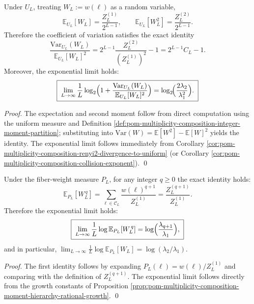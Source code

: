\begin{corollary}\label{cor:pom-multiplicity-composition-uniform-variance-explosion}
Under \(U_L\), treating \(W_L:=w(\boldsymbol{\ell})\) as a random variable,
\[
\mathbb{E}_{U_L}[W_L]=\frac{Z_L^{(1)}}{2^{L-1}},
\qquad
\mathbb{E}_{U_L}[W_L^2]=\frac{Z_L^{(2)}}{2^{L-1}}.
\]
Therefore the coefficient of variation satisfies the exact identity
\[
\boxed{\;
\frac{\mathrm{Var}_{U_L}(W_L)}{\mathbb{E}_{U_L}[W_L]^2}
=2^{L-1}\frac{Z_L^{(2)}}{(Z_L^{(1)})^2}-1
=2^{L-1}C_L-1.\;}
\]
Moreover, the exponential limit holds:
\[
\boxed{\;
\lim_{L\to\infty}\frac{1}{L}\log_2\Bigl(1+\frac{\mathrm{Var}_{U_L}(W_L)}{\mathbb{E}_{U_L}[W_L]^2}\Bigr)
=\log_2\!\Bigl(\frac{2\lambda_2}{\lambda_1^2}\Bigr).\;}
\]
\end{corollary}
\begin{proof}
The expectation and second moment follow from direct computation using the uniform measure and Definition \ref{def:pom-multiplicity-composition-integer-moment-partition};
substituting into \(\mathrm{Var}(W)=\mathbb{E}[W^2]-\mathbb{E}[W]^2\) yields the identity.
The exponential limit follows immediately from Corollary \ref{cor:pom-multiplicity-composition-renyi2-divergence-to-uniform} (or Corollary \ref{cor:pom-multiplicity-composition-collision-exponent}). \qed
\end{proof}

\begin{proposition}\label{prop:pom-multiplicity-composition-moment-shift-law}
Under the fiber-weight measure \(P_L\), for any integer \(q\ge 0\) the exact identity holds:
\[
\boxed{\;
\mathbb{E}_{P_L}[W_L^{\,q}]
=\sum_{\boldsymbol{\ell}\in\mathcal{C}_L}\frac{w(\boldsymbol{\ell})^{q+1}}{Z_L^{(1)}}
=\frac{Z_L^{(q+1)}}{Z_L^{(1)}}.\;}
\]
Therefore the exponential limit holds:
\[
\boxed{\;
\lim_{L\to\infty}\frac{1}{L}\log \mathbb{E}_{P_L}[W_L^{\,q}]
=\log\Bigl(\frac{\lambda_{q+1}}{\lambda_1}\Bigr),\;}
\]
and in particular,
\(
\lim_{L\to\infty}\frac{1}{L}\log \mathbb{E}_{P_L}[W_L]=\log(\lambda_2/\lambda_1)
\).
\end{proposition}
\begin{proof}
The first identity follows by expanding \(P_L(\boldsymbol{\ell})=w(\boldsymbol{\ell})/Z_L^{(1)}\) and comparing with the definition of \(Z_L^{(q+1)}\).
The exponential limit follows directly from the growth constants of Proposition \ref{prop:pom-multiplicity-composition-moment-hierarchy-rational-growth}. \qed
\end{proof}


